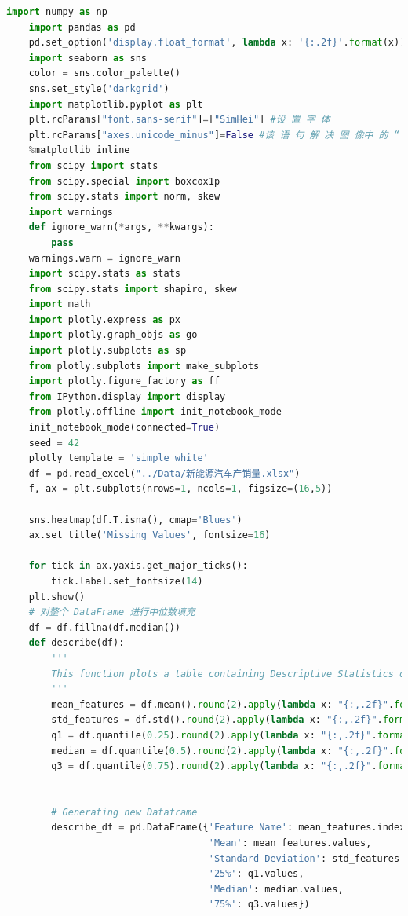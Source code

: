 \documentclass{apmcmthesis}
\begin{document}
\begin{lstlisting}[language=Python,caption={The Python Source code of Algorithm}]
    import numpy as np
    import pandas as pd
    pd.set_option('display.float_format', lambda x: '{:.2f}'.format(x))
    import seaborn as sns
    color = sns.color_palette()
    sns.set_style('darkgrid')
    import matplotlib.pyplot as plt
    plt.rcParams["font.sans-serif"]=["SimHei"] #设 置 字 体
    plt.rcParams["axes.unicode_minus"]=False #该 语 句 解 决 图 像中 的 “ -” 负 号 的 乱 码 问 题
    %matplotlib inline
    from scipy import stats
    from scipy.special import boxcox1p
    from scipy.stats import norm, skew
    import warnings
    def ignore_warn(*args, **kwargs):
        pass
    warnings.warn = ignore_warn
    import scipy.stats as stats
    from scipy.stats import shapiro, skew
    import math
    import plotly.express as px
    import plotly.graph_objs as go
    import plotly.subplots as sp
    from plotly.subplots import make_subplots
    import plotly.figure_factory as ff
    from IPython.display import display
    from plotly.offline import init_notebook_mode
    init_notebook_mode(connected=True)
    seed = 42
    plotly_template = 'simple_white'
    df = pd.read_excel("../Data/新能源汽车产销量.xlsx")
    f, ax = plt.subplots(nrows=1, ncols=1, figsize=(16,5))
    
    sns.heatmap(df.T.isna(), cmap='Blues')
    ax.set_title('Missing Values', fontsize=16)
    
    for tick in ax.yaxis.get_major_ticks():
        tick.label.set_fontsize(14)
    plt.show()
    # 对整个 DataFrame 进行中位数填充
    df = df.fillna(df.median())
    def describe(df):
        '''
        This function plots a table containing Descriptive Statistics of the Dataframe
        '''
        mean_features = df.mean().round(2).apply(lambda x: "{:,.2f}".format(x)) 
        std_features = df.std().round(2).apply(lambda x: "{:,.2f}".format(x)) 
        q1 = df.quantile(0.25).round(2).apply(lambda x: "{:,.2f}".format(x))
        median = df.quantile(0.5).round(2).apply(lambda x: "{:,.2f}".format(x))
        q3 = df.quantile(0.75).round(2).apply(lambda x: "{:,.2f}".format(x))
    
    
        # Generating new Dataframe
        describe_df = pd.DataFrame({'Feature Name': mean_features.index,
                                    'Mean': mean_features.values,
                                    'Standard Deviation': std_features.values,
                                    '25%': q1.values,
                                    'Median': median.values,
                                    '75%': q3.values})
    

\end{lstlisting}
\end{document}
